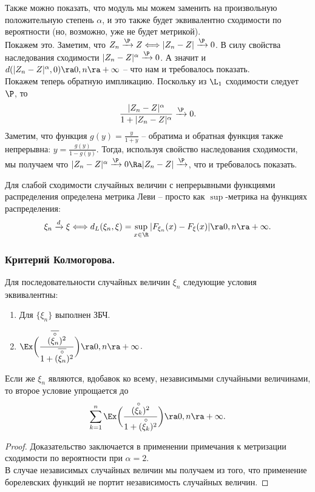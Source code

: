 \begin{note}
    Также можно показать, что модуль мы можем заменить на произвольную положительную степень $\alpha$, и это также будет эквивалентно сходимости по вероятности (но, возможно, уже не будет метрикой). \\
    Покажем это.
    Заметим, что $Z_n \xrightarrow{\P} Z \Longleftrightarrow |Z_n - Z| \xrightarrow{\P} 0$.
    В силу свойства наследования сходимости $|Z_n - Z|^\alpha \xrightarrow{\P} 0$.
    А значит и $d(|Z_n - Z|^\alpha, 0) \ra 0, n \ra +\infty$ -- что нам и требовалось показать. \\
    Покажем теперь обратную импликацию. Поскольку из $\L_1$ сходимости следует $\P$, то
    \[
        \dfrac{|Z_n - Z|^\alpha}{1 + |Z_n - Z|^\alpha} \xrightarrow{\P} 0.
    \]
    Заметим, что функция $g(y) = \frac{y}{1 + y}$ -- обратима и обратная функция также непрерывна: $y = \frac{g(y)}{1 - g(y)}$.
    Тогда, используя свойство наследования сходимости, мы получаем что $|Z_n - Z|^\alpha \xrightarrow{\P} 0 \Ra |Z_n - Z|\xrightarrow{\P}$, что и требовалось показать.
\end{note}
\begin{note}
    Для слабой сходимости случайных величин с непрерывными функциями распределения определена метрика Леви -- просто как $\sup$-метрика на функциях распределения:
    \[
        \xi_n \xrightarrow{d} \xi \Longleftrightarrow d_L(\xi_n, \xi) = \sup\limits_{x \in \R} |F_{\xi_n}(x) - F_{\xi}(x)| \ra 0, n \ra +\infty.
    \]
\end{note}
\subsubsection{Критерий Колмогорова.}
\begin{theorem}
    Для последовательности случайных величин $\xi_n$ следующие условия эквивалентны:
    \begin{enumerate}
        \item Для $\{\xi_n\}$ выполнен ЗБЧ.
        \item $\Ex \biggr( \dfrac{(\overline{\overset{\circ}{\xi_n}})^2}{1 + (\overline{\overset{\circ}{\xi_n}})^2}\biggr) \ra 0, n \ra +\infty$.
    \end{enumerate}
    Если же $\xi_n$ являются, вдобавок ко всему, независимыми случайными величинами, то второе условие упрощается до
    \[
        \sum\limits_{k = 1}^{n} \Ex \biggr(\dfrac{ (\overset{\circ}{\xi_k})^2}{1 + (\overset{\circ}{\xi_k})^2}\biggr) \ra 0, n \ra +\infty.
    \]
\end{theorem}
\begin{proof}
    Доказательство заключается в применении примечания к метризации сходимости по вероятности при $\alpha = 2$. \\
    В случае независимых случайных величин мы получаем из того, что применение борелевских функций не портит независимость случайных величин.
\end{proof}
